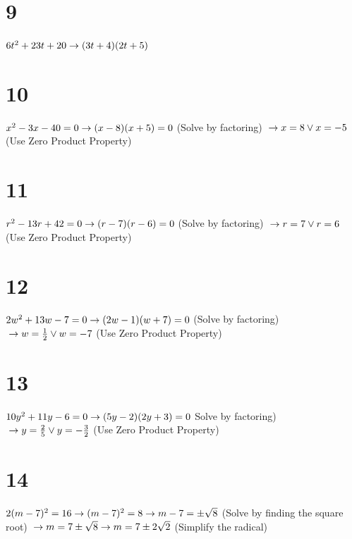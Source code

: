 \documentclass{article}
\theoremstyle{definition}
\begin{document}
\section*{9}
$6t^2+23t+20\newline\rightarrow
(3t+4)(2t+5)$

\section*{10}
$x^2-3x-40=0\newline\rightarrow 
(x-8)(x+5)=0$ (Solve by factoring)
$\newline\rightarrow x=8\vee x=-5$ (Use Zero Product Property)

\section*{11}
$r^2-13r+42=0\newline\rightarrow 
(r-7)(r-6)=0$ (Solve by factoring)
$\newline\rightarrow r=7\vee r=6$ (Use Zero Product Property)

\section*{12}
$2w^2+13w-7=0\newline\rightarrow 
(2w-1)(w+7)=0$ (Solve by factoring)
$\newline\rightarrow w=\frac{1}{2}\vee w=-7$ (Use Zero Product Property)

\section*{13}
$10y^2+11y-6=0\newline\rightarrow 
(5y-2)(2y+3)=0$ Solve by factoring)
$\newline\rightarrow y=\frac{2}{5}\vee y=-\frac{3}{2}$ (Use Zero Product Property)

\section*{14}
$2(m-7)^2=16\newline\rightarrow 
(m-7)^2=8\newline\rightarrow 
m-7=\pm\sqrt{8}$ (Solve by finding the square root)
$\newline\rightarrow m=7\pm\sqrt{8}\newline\rightarrow 
m=7\pm 2\sqrt{2}$ (Simplify the radical)
\end{document}
